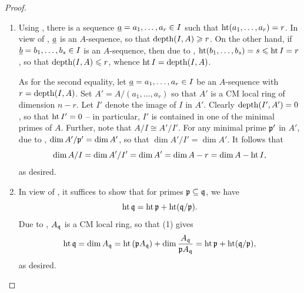 \begin{proof}
\begin{enumerate}[label=(\arabic*)]
    \item Using , there is a sequence $\underline{a} = a_1,\dots,a_r\in I$ such that $\operatorname{ht} (a_1,\dots,a_r) = r$. In view of , $\underline{a}$ is an $A$-sequence, so that $\operatorname{depth}(I, A)\geqslant r$. On the other hand, if $\underline{b} = b_1,\dots, b_s\in I$ is an $A$-sequence, then due to , $\operatorname{ht} (b_1,\dots,b_s) = s\leqslant \operatorname{ht} I = r$, so that $\operatorname{depth}(I, A)\leqslant r$, whence $\operatorname{ht} I = \operatorname{depth}(I, A)$. 
    
    As for the second equality, let $\underline{a} = a_1,\dots,a_r\in I$ be an $A$-sequence with $r = \operatorname{depth}(I, A)$. Set $A' = A/(a_1,\dots,a_r)$ so that $A'$ is a CM local ring of dimension $n - r$. Let $I'$ denote the image of $I$ in $A'$. Clearly $\operatorname{depth}(I', A') = 0$, so that $\operatorname{ht} I' = 0$ -- in particular, $I'$ is contained in one of the minimal primes of $A$. Further, note that $A/I\cong A'/I'$. For any minimal prime $\mathfrak{p}'$ in $A'$, due to , $\dim A'/\mathfrak{p}' = \dim A'$, so that $\dim A'/I' = \dim A'$. It follows that 
    \begin{equation*}
        \dim A/I = \dim A'/I' = \dim A' = \dim A - r = \dim A - \operatorname{ht} I,
    \end{equation*}
    as desired. 

    \item In view of , it suffices to show that for primes $\mathfrak{p}\subseteq\mathfrak{q}$, we have 
    \begin{equation*}
        \operatorname{ht}\mathfrak{q} = \operatorname{ht}\mathfrak{p} + \operatorname{ht}(\mathfrak{q}/\mathfrak{p}).
    \end{equation*}
    Due to , $A_{\mathfrak{q}}$ is a CM local ring, so that (1) gives 
    \begin{equation*}
        \operatorname{ht}\mathfrak{q} = \dim A_{\mathfrak{q}} = \operatorname{ht}\left(\mathfrak{p} A_{\mathfrak{q}}\right) + \dim \frac{A_{\mathfrak{q}}}{\mathfrak{p} A_{\mathfrak{q}}} = \operatorname{ht}\mathfrak{p} + \operatorname{ht}(\mathfrak{q}/\mathfrak{p}),
    \end{equation*}
    as desired. \qedhere
\end{enumerate}
\end{proof}